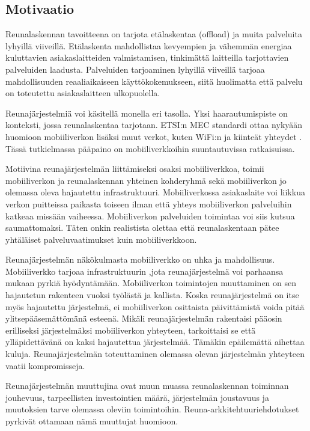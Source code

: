 \subsection{Motivaatio}
Reunalaskennan tavoitteena on tarjota etälaskentaa (offload) ja muita palveluita lyhyillä viiveillä. 
Etälaskenta mahdollistaa kevyempien ja vähemmän energiaa kuluttavien asiakaslaitteiden valmistamisen, tinkimättä laitteilla tarjottavien palveluiden laadusta.
Palveluiden tarjoaminen lyhyillä viiveillä tarjoaa mahdollisuuden reaaliaikaiseen käyttökokemukseen, siitä huolimatta että palvelu on toteutettu asiakaslaitteen ulkopuolella. 

Reunajärjestelmiä voi käsitellä monella eri tasolla. Yksi haarautumispiste on  konteksti, jossa reunalaskentaa tarjotaan. ETSI:n MEC standardi ottaa nykyään huomioon mobiiliverkon lisäksi muut verkot, kuten WiFi:n ja kiinteät yhteydet \cite{taleb2017multi}. Tässä tutkielmassa pääpaino on mobiiliverkkoihin suuntautuvissa ratkaisuissa.

Motiivina reunajärjestelmän liittämiseksi osaksi mobiiliverkkoa, toimii mobiiliverkon ja reunalaskennan yhteinen kohderyhmä sekä mobiiliverkon jo olemassa oleva hajautettu infrastruktuuri.
Mobiiliverkossa asiakaslaite voi liikkua verkon puitteissa paikasta toiseen ilman että yhteys mobiiliverkon palveluihin katkeaa missään vaiheessa. Mobiiliverkon palveluiden toimintaa voi siis kutsua saumattomaksi. 
Täten onkin realistista olettaa että reunalaskentaan pätee yhtäläiset palveluvaatimukset kuin mobiiliverkkoon.

Reunajärjestelmän näkökulmasta mobiiliverkko on uhka ja mahdollisuus. Mobiiliverkko tarjoaa infrastruktuurin ,jota reunajärjestelmä voi parhaansa mukaan pyrkiä hyödyntämään. Mobiiliverkon toimintojen muuttaminen on sen hajautetun rakenteen vuoksi työlästä ja kallista. Koska reunajärjestelmä on itse myös hajautettu järjestelmä, ei mobiiliverkon osittaista päivittämistä voida pitää ylitsepääsemättömänä esteenä. 
Mikäli reunajärjestelmän rakentaisi pääosin erilliseksi järjestelmäksi mobiiliverkon yhteyteen, tarkoittaisi se että ylläpidettävänä on kaksi hajautettua järjestelmää. Tämäkin epäilemättä aihettaa kuluja.
Reunajärjestelmän toteuttaminen olemassa olevan järjestelmän yhteyteen vaatii kompromisseja.

Reunajärjestelmän muuttujina ovat muun muassa reunalaskennan toiminnan jouhevuus, tarpeellisten investointien määrä, järjestelmän joustavuus ja muutoksien tarve olemassa oleviin toimintoihin.
Reuna-arkkitehtuuriehdotukset pyrkivät ottamaan nämä muuttujat huomioon.
